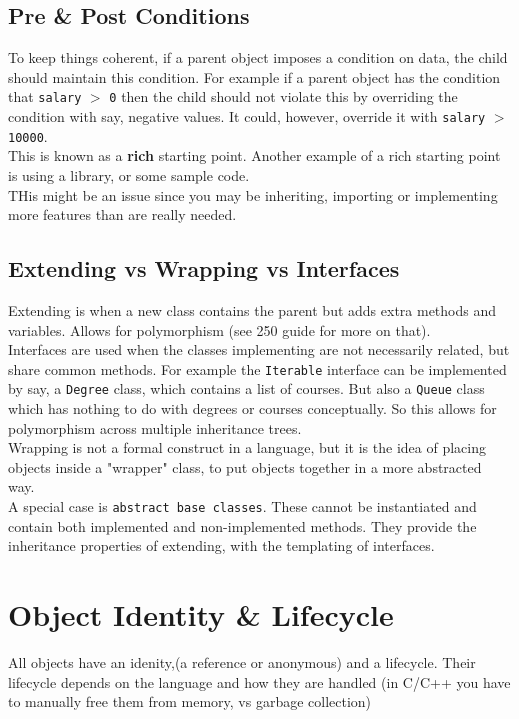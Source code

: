 \documentclass[12pt]{article}
\theoremstyle{definition}
\begin{document}
\subsection{Pre \& Post Conditions}
To keep things coherent, if a parent object imposes a condition on data, the child should maintain this condition. For example if a parent object has the condition that \texttt{salary} $>$ \texttt{0} then the child should not violate this by overriding the condition with say, negative values. It could, however, override it with \texttt{salary} $>$ \texttt{10000}.
\\ \linebreak
This is known as a \textbf{rich} starting point. Another example of a rich starting point is using a library, or some sample code.
\\ \linebreak
THis might be an issue since you may be inheriting, importing or implementing more features than are really needed.
\subsection{Extending vs Wrapping vs Interfaces}
Extending is when a new class contains the parent but adds extra methods and variables. Allows for polymorphism (see 250 guide for more on that). 
\\ \linebreak
Interfaces are used when the classes implementing are not necessarily related, but share common methods. For example the \texttt{Iterable} interface can be implemented by say, a \texttt{Degree} class, which contains a list of courses. But also a \texttt{Queue} class which has nothing to do with degrees or courses conceptually. So this allows for polymorphism across multiple inheritance trees.
\\ \linebreak
Wrapping is not a formal construct in a language, but it is the idea of placing objects inside a "wrapper" class, to put objects together in a more abstracted way.
\\ \linebreak
A special case is \texttt{abstract base classes}. These cannot be instantiated and contain both implemented and non-implemented methods. They provide the inheritance properties of extending, with the templating of interfaces. 

\section{Object Identity \& Lifecycle}
All objects have an idenity,(a reference or anonymous) and a lifecycle. Their lifecycle depends on the language and how they are handled (in C/C++ you have to manually free them from memory, vs garbage collection)
\end{document}
